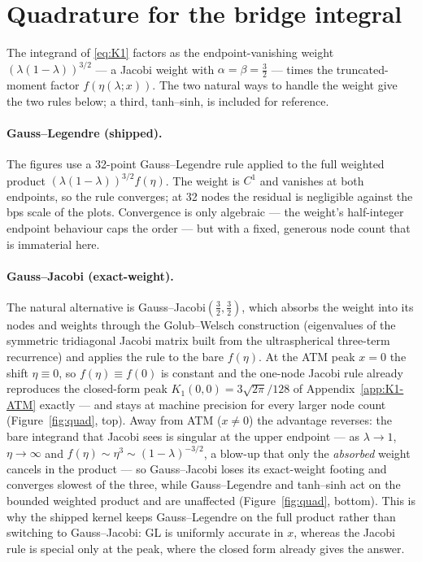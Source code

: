 \documentclass[11pt]{article}
\begin{document}
\section{Quadrature for the bridge integral}\label{app:quad}

The integrand of \eqref{eq:K1} factors as the endpoint-vanishing weight
$(\lambda(1-\lambda))^{3/2}$ --- a Jacobi weight with
$\alpha=\beta=\tfrac32$ --- times the truncated-moment factor
$f(\eta(\lambda;x))$. The two natural ways to handle the weight give
the two rules below; a third, tanh--sinh, is included for reference.

\paragraph{Gauss--Legendre (shipped).} The figures use a 32-point
Gauss--Legendre rule applied to the full weighted product
$(\lambda(1-\lambda))^{3/2} f(\eta)$. The weight is $C^1$ and vanishes
at both endpoints, so the rule converges; at 32 nodes the residual is
negligible against the bps scale of the plots. Convergence is only
algebraic --- the weight's half-integer endpoint behaviour caps the
order --- but with a fixed, generous node count that is immaterial here.

\paragraph{Gauss--Jacobi (exact-weight).} The natural alternative is
Gauss--Jacobi$(\tfrac32,\tfrac32)$, which absorbs the weight into its
nodes and weights through the Golub--Welsch construction (eigenvalues
of the symmetric tridiagonal Jacobi matrix built from the
ultraspherical three-term recurrence) and applies the rule to the bare
$f(\eta)$. At the ATM peak $x=0$ the shift $\eta\equiv0$, so
$f(\eta)\equiv f(0)$ is constant and the one-node Jacobi rule already
reproduces the closed-form peak $K_1(0,0)=3\sqrt{2\pi}/128$ of
Appendix~\ref{app:K1-ATM} exactly --- and stays at machine precision
for every larger node count (Figure~\ref{fig:quad}, top). Away from ATM
($x\neq0$) the advantage reverses: the bare integrand that Jacobi sees
is singular at the upper endpoint --- as $\lambda\to1$, $\eta\to\infty$
and $f(\eta)\sim\eta^3\sim(1-\lambda)^{-3/2}$, a blow-up that only the
\emph{absorbed} weight cancels in the product --- so Gauss--Jacobi loses
its exact-weight footing and converges slowest of the three, while
Gauss--Legendre and tanh--sinh act on the bounded weighted product and
are unaffected (Figure~\ref{fig:quad}, bottom). This is why the shipped
kernel keeps Gauss--Legendre on the full product rather than switching
to Gauss--Jacobi: GL is uniformly accurate in $x$, whereas the Jacobi
rule is special only at the peak, where the closed form already gives
the answer.
\end{document}
